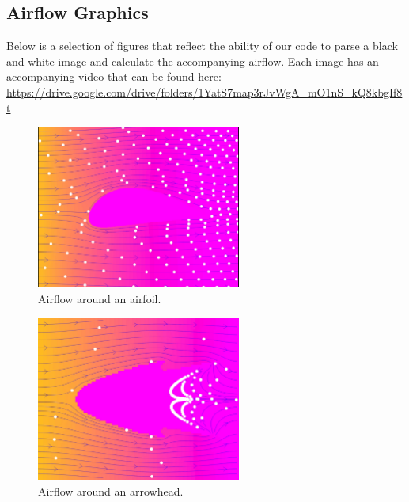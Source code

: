 \documentclass[11pt]{article}
\begin{document}
\subsection{Airflow Graphics}
Below is a selection of figures that reflect the ability of our code to parse a black and white image and calculate the accompanying airflow. Each image has an accompanying video that can be found here: \href{https://drive.google.com/drive/folders/1YatS7map3rJvWgA_mO1nS_kQ8kbgIf8t}{https://drive.google.com/drive/folders/1YatS7map3rJvWgA\_mO1nS\_kQ8kbgIf8t}

\begin{figure} [H] %
	\centering
	\includegraphics[width=0.6\textwidth]{airfoil.png}
	\caption{Airflow around an airfoil.}
\end{figure}

\begin{figure} [H] %
	\centering
	\includegraphics[width=0.6\textwidth]{arrowhead.png}
	\caption{Airflow around an arrowhead.}
\end{figure}
\end{document}
